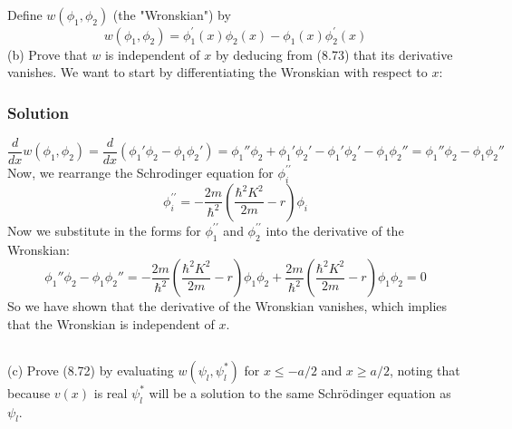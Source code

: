 \documentclass[12pt]{article}
\begin{document}
Define $w\left(\phi_1, \phi_2\right)$ (the "Wronskian") by
$$
w\left(\phi_1, \phi_2\right)=\phi_1^{\prime}(x) \phi_2(x)-\phi_1(x) \phi_2^{\prime}(x)
$$
(b) Prove that $w$ is independent of $x$ by deducing from (8.73) that its derivative vanishes.
We want to start by differentiating the Wronskian with respect to $x$:
\subsubsection{Solution}
\begin{equation}
    \frac{d}{dx}w(\phi_1, \phi_2) = \frac{d}{dx}\left(\phi_1'\phi_2 - \phi_1\phi_2'\right) = \phi_1''\phi_2 + \phi_1'\phi_2' - \phi_1'\phi_2' - \phi_1\phi_2'' = \phi_1''\phi_2 - \phi_1\phi_2''
\end{equation}
Now, we rearrange the Schrodinger equation for $\phi_i^{\prime\prime}$
\begin{equation}
    \phi_i^{\prime\prime} = -\frac{2m}{\hbar^2}\left(\frac{\hbar^2 K^2}{2m} - r\right)\phi_i
\end{equation}
Now we substitute in the forms for $\phi_1^{\prime\prime}$ and $\phi_2^{\prime\prime}$ into the derivative of the Wronskian:
\begin{equation}
    \phi_1''\phi_2 - \phi_1\phi_2'' = -\frac{2m}{\hbar^2}\left(\frac{\hbar^2 K^2}{2m} - r\right)\phi_1\phi_2 + \frac{2m}{\hbar^2}\left(\frac{\hbar^2 K^2}{2m} - r\right)\phi_1\phi_2 = 0
\end{equation}
So we have shown that the derivative of the Wronskian vanishes, which implies that the Wronskian is independent of $x$.
\subsection{}
(c) Prove (8.72) by evaluating $w\left(\psi_l, \psi_l^*\right)$ for $x \leqslant-a / 2$ and $x \geqslant a / 2$, noting that because $v(x)$ is real $\psi_l^*$ will be a solution to the same Schrödinger equation as $\psi_l$.
\end{document}

